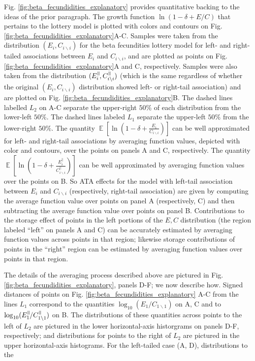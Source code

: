 \documentclass[letterpaper,11pt]{article}
\DeclareMathOperator{\E}{\mathbb{E}}%
\newcommand{\nat}{%
\text{\hspace{-1.5pt}
\begin{tikzpicture}[scale=1.8]%
\draw (.333ex,0) -- (.333ex,1ex);%
\draw (.666ex,0) -- (.666ex,1ex);
\end{tikzpicture}%
}}
\newcommand{\bs}{\backslash}
\begin{document}
Fig. \ref{fig:beta_fecundidities_explanatory} provides quantitative backing to
the ideas of the prior paragraph. The growth function $\ln(1-\delta+E/C)$ that pertains 
to the lottery model
is plotted with colors and contours on Fig. \ref{fig:beta_fecundidities_explanatory}A-C.
Samples were taken from the distribution $(E_i,C_{i \bs i})$ for the beta 
fecundities lottery model for left- and right-tailed 
associations between $E_i$ and $C_{i \bs i}$, and are plotted as
points on Fig. \ref{fig:beta_fecundidities_explanatory}A and C, respectively. 
Samples were also taken from the distribution $(E_i^\nat,C_{i \bs i}^\nat)$
(which is the same regardless of whether the original $(E_i,C_{i \bs i})$
distribution showed left- or right-tail association) and are plotted on 
Fig. \ref{fig:beta_fecundidities_explanatory}B. 
The dashed lines labelled $L_2$ on A-C separate the upper-right $50\%$
of each distribution from the lower-left $50\%$. The dashed lines labeled
$L_1$ separate the upper-left $50\%$ from the lower-right $50\%$.
The quantity $\E \left[ \ln \left( 1-\delta+\frac{E_i}{C_{i \bs i}} \right) \right]$ can be
well approximated for left- and right-tail associations by averaging function 
values, depicted with color and contours, over the points on panels A and C, respectively. The quantity
$\E \left[ \ln \left( 1-\delta+\frac{E_i^{||}}{C_{i \bs i}^{||}} \right) \right]$
can be well approximated by averaging function 
values over the points on B. So ATA effects for the model with left-tail association
between $E_i$ and $C_{i \bs i}$ (respectively, right-tail association) are given by 
computing the average function value over points on panel A (respectively, C)
and then subtracting the average function value over points on panel B.
Contributions to the storage effect of points in the left portions of 
the $E,C$ distribution (the region labeled ``left'' on panels A and C)
can be accurately estimated by averaging function values across
points in that region; likewise storage contributions of points in the 
``right'' region can be estimated by averaging function values over 
points in that region. 

The details of the averaging process described above are pictured in 
Fig. \ref{fig:beta_fecundidities_explanatory}, panels D-F;
we now describe how. 
Signed distances of points on Fig. \ref{fig:beta_fecundidities_explanatory} 
A-C from the lines $L_1$ correspond to 
the quantities $\log_{10}(E_1/C_{1 \bs 1})$ on A, C and to 
$\log_{10}(E_1^\nat/C_{1 \bs 1}^\nat)$ on B. The distributions of these 
quantities across points to the left of $L_2$ are pictured 
in the lower horizontal-axis historgrams on panels D-F, respectively;
and distributions for points to the right of $L_2$ are 
pictured in the upper horizontal-axis histograms. 
For the left-tailed case (A, D), distributions to the  
\end{document}
